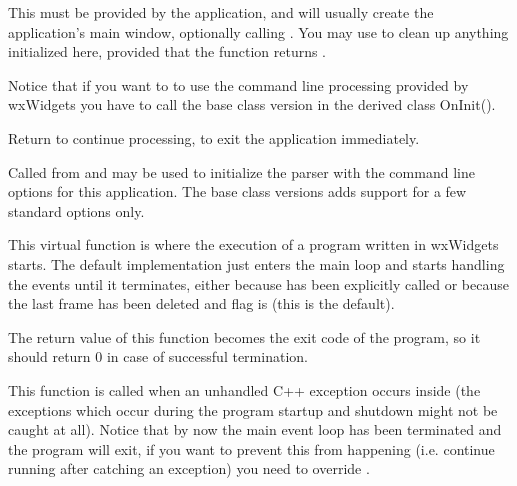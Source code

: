 
This must be provided by the application, and will usually create the
application's main window, optionally calling 
. You may use 
 to clean up anything initialized here, provided
that the function returns \true.

Notice that if you want to to use the command line processing provided by
wxWidgets you have to call the base class version in the derived class
OnInit().

Return \true to continue processing, \false to exit the application
immediately.


\label{wxapponinitcmdline}


Called from  and may be used to initialize the
parser with the command line options for this application. The base class
versions adds support for a few standard options only.

\label{wxapponrun}


This virtual function is where the execution of a program written in wxWidgets
starts. The default implementation just enters the main loop and starts
handling the events until it terminates, either because 
 has been explicitly called or because
the last frame has been deleted and 
 flag is \true (this
is the default).

The return value of this function becomes the exit code of the program, so it
should return $0$ in case of successful termination.


\label{wxapponunhandledexception}


This function is called when an unhandled C++ exception occurs inside 
 (the exceptions which occur during the program
startup and shutdown might not be caught at all). Notice that by now the main
event loop has been terminated and the program will exit, if you want to
prevent this from happening (i.e. continue running after catching an exception)
you need to override .

